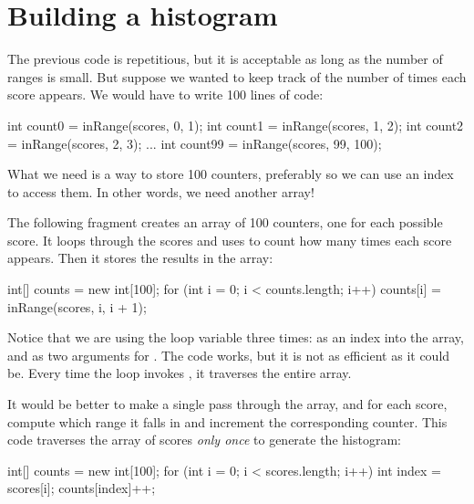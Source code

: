 \section{Building a histogram}

The previous code is repetitious, but it is acceptable as long as the number of ranges is small.
But suppose we wanted to keep track of the number of times each score appears.
We would have to write 100 lines of code:

\begin{code}
int count0 = inRange(scores, 0, 1);
int count1 = inRange(scores, 1, 2);
int count2 = inRange(scores, 2, 3);
...
int count99 = inRange(scores, 99, 100);
\end{code}

What we need is a way to store 100 counters, preferably so we can use an index to access them.
In other words, we need another array!

The following fragment creates an array of 100 counters, one for each possible score.
It loops through the scores and uses  to count how many times each score appears.
Then it stores the results in the array:

\begin{code}
int[] counts = new int[100];
for (int i = 0; i < counts.length; i++) {
    counts[i] = inRange(scores, i, i + 1);
}
\end{code}

Notice that we are using the loop variable  three times: as an index into the  array, and as two arguments for .
%
%
The code works, but it is not as efficient as it could be.
Every time the loop invokes , it traverses the entire array.


It would be better to make a single pass through the array, and for each score, compute which range it falls in and increment the corresponding counter.
This code traverses the array of scores {\em only once} to generate the histogram:

\begin{code}
int[] counts = new int[100];
for (int i = 0; i < scores.length; i++) {
    int index = scores[i];
    counts[index]++;
}
\end{code}

